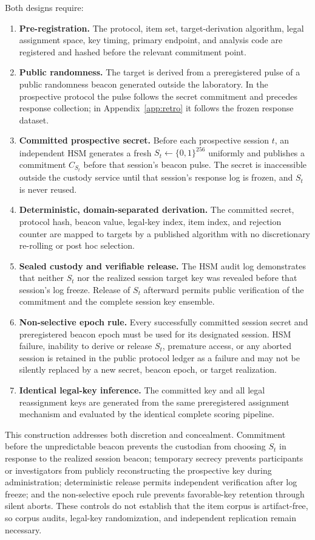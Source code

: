 \documentclass[11pt,letterpaper]{article}
\begin{document}
Both designs require:
\begin{enumerate}[nosep]
\item \textbf{Pre-registration.} The protocol, item set, target-derivation algorithm, legal assignment space, key timing, primary endpoint, and analysis code are registered and hashed before the relevant commitment point.
\item \textbf{Public randomness.} The target is derived from a preregistered pulse of a public randomness beacon generated outside the laboratory. In the prospective protocol the pulse follows the secret commitment and precedes response collection; in Appendix~\ref{app:retro} it follows the frozen response dataset.
\item \textbf{Committed prospective secret.} Before each prospective session $t$, an independent HSM generates a fresh $S_t\leftarrow\{0,1\}^{256}$ uniformly and publishes a commitment $C_{S_t}$ before that session's beacon pulse. The secret is inaccessible outside the custody service until that session's response log is frozen, and $S_t$ is never reused.
\item \textbf{Deterministic, domain-separated derivation.} The committed secret, protocol hash, beacon value, legal-key index, item index, and rejection counter are mapped to targets by a published algorithm with no discretionary re-rolling or post hoc selection.
\item \textbf{Sealed custody and verifiable release.} The HSM audit log demonstrates that neither $S_t$ nor the realized session target key was revealed before that session's log freeze. Release of $S_t$ afterward permits public verification of the commitment and the complete session key ensemble.
\item \textbf{Non-selective epoch rule.} Every successfully committed session secret and preregistered beacon epoch must be used for its designated session. HSM failure, inability to derive or release $S_t$, premature access, or any aborted session is retained in the public protocol ledger as a failure and may not be silently replaced by a new secret, beacon epoch, or target realization.
\item \textbf{Identical legal-key inference.} The committed key and all legal reassignment keys are generated from the same preregistered assignment mechanism and evaluated by the identical complete scoring pipeline.
\end{enumerate}

This construction addresses both discretion and concealment. Commitment before the unpredictable beacon prevents the custodian from choosing $S_t$ in response to the realized session beacon; temporary secrecy prevents participants or investigators from publicly reconstructing the prospective key during administration; deterministic release permits independent verification after log freeze; and the non-selective epoch rule prevents favorable-key retention through silent aborts. These controls do not establish that the item corpus is artifact-free, so corpus audits, legal-key randomization, and independent replication remain necessary.
\end{document}
